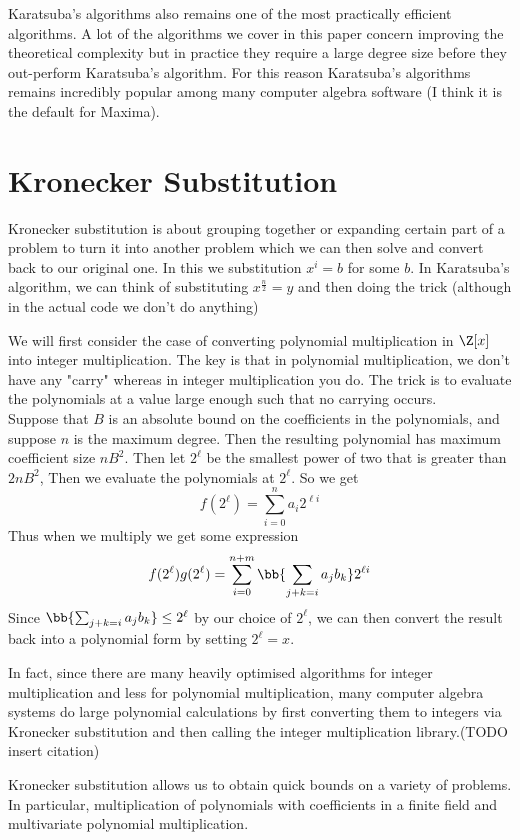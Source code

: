 Karatsuba's algorithms also remains one of the most practically efficient algorithms. A lot of the algorithms we cover in this paper concern improving the theoretical complexity but in practice they require a large degree size before they out-perform Karatsuba's algorithm. For this reason Karatsuba's algorithms remains incredibly popular among many computer algebra software (I think it is the default for Maxima).


\section{Kronecker Substitution}%
\label{sub:kronecker_substitution}

Kronecker substitution is about grouping together or expanding certain part of a problem to turn it into another problem which we can then solve and convert back to our original one. In this we substitution $x^i = b$ for some $b$. In Karatsuba's algorithm, we can think of substituting $x^{\frac{n}{2}} = y$ and then doing the trick (although in the actual code we don't do anything)

We will first consider the case of converting polynomial multiplication in $\Z[x]$ into integer multiplication. The key is that in polynomial multiplication, we don't have any "carry" whereas in integer multiplication you do. The trick is to evaluate the polynomials at a value large enough such that no carrying occurs.\\
Suppose that $B$ is an absolute bound on the coefficients in the polynomials, and suppose $n$ is the maximum degree. Then the resulting polynomial has maximum coefficient size $nB^2$. Then let $2^\ell$ be the smallest power of two that is greater than $2nB^2$, Then we evaluate the polynomials at $2^\ell$. So we get
\[
    f(2^\ell) = \sum^n_{i = 0} a_i 2^{\ell i}
\]
Thus when we multiply we get some expression 
\[
    f(2^\ell)g(2^\ell) = \sum^{n+m}_{i=0} \bb{\sum_{j + k = i} a_jb_k}2^{\ell i}  
\]
Since $\bb{\sum_{j + k = i}a_j b_k} \leq 2^{\ell}$ by our choice of $2^\ell$, we can then convert the result back into a polynomial form by setting $2^\ell = x$. 

In fact, since there are many heavily optimised algorithms for integer multiplication and less for polynomial multiplication, many computer algebra systems do large polynomial calculations by first converting them to integers via Kronecker substitution and then calling the integer multiplication library.(TODO insert citation)

Kronecker substitution allows us to obtain quick bounds on a variety of problems. In particular, multiplication of polynomials with coefficients in a finite field and multivariate polynomial multiplication. 

